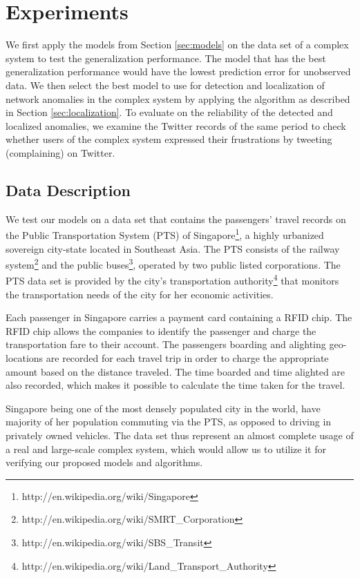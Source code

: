 \documentclass{sig-alternate}
\begin{document}
\section{Experiments}
\label{sec:experiments}

We first apply the models from Section \ref{sec:models} on the data set of a complex system to test the generalization performance. The model that has the best generalization performance would have the lowest prediction error for unobserved data. We then select the best model to use for detection and localization of network anomalies in the complex system by applying the algorithm as described in Section \ref{sec:localization}. To evaluate on the reliability of the detected and localized anomalies, we examine the Twitter records of the same period to check whether users of the complex system expressed their frustrations by tweeting (complaining) on Twitter.

\subsection{Data Description}

We test our models on a data set that contains the passengers' travel records on the Public Transportation System (PTS) of Singapore\footnote{http://en.wikipedia.org/wiki/Singapore}, a highly urbanized sovereign city-state located in Southeast Asia. The PTS consists of the railway system\footnote{http://en.wikipedia.org/wiki/SMRT\_Corporation} and the public buses\footnote{http://en.wikipedia.org/wiki/SBS\_Transit}, operated by two public listed corporations. The PTS data set is provided by the city's transportation authority\footnote{http://en.wikipedia.org/wiki/Land\_Transport\_Authority} that monitors the transportation needs of the city for her economic activities.

Each passenger in Singapore carries a payment card containing a RFID chip. The RFID chip allows the companies to identify the passenger and charge the transportation fare to their account. The passengers boarding and alighting geo-locations are recorded for each travel trip in order to charge the appropriate amount based on the distance traveled. The time boarded and time alighted are also recorded, which makes it possible to calculate the time taken for the travel.

Singapore being one of the most densely populated city in the world, have majority of her population commuting via the PTS, as opposed to driving in privately owned vehicles. The data set thus represent an almost complete usage of a real and large-scale complex system, which would allow us to utilize it for verifying our proposed models and algorithms.
\end{document}

